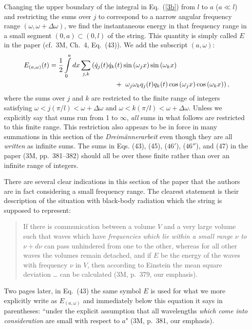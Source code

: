 \documentclass[12pt]{elsart}
\begin{document}
Changing the upper boundary  of the integral in Eq.\ (\ref{3b}) from $l$ to $a$ ($a \ll l$) and restricting the sums over $j$ to correspond to a narrow angular frequency range $(\omega, \omega + \Delta \omega)$, we find the instantaneous energy in that frequency range in a small segment $(0, a) \subset (0, l)$ of the string. This quantity is simply called $E$ in the paper (cf.\ 3M, Ch.\ 4, Eq.\ (43)). We add the subscript $(a, \omega)$:  
\begin{eqnarray}
\lefteqn{ E_{(a, \omega)}(t) = \frac{1}{2} \int_0^a dx \sum_{j,k}  \left(  \dot{q}_j(t) \dot{q}_k(t) 
\sin{(\omega_j x)} \sin{(\omega_k x)} \right.  } \nonumber \\
 & & \;\;\;\;\;\;\;\;\;  \;\;\;\;\;\;\;\;\; \;\;\;\;\;\;\;\;\; \;\;\;\;\;\;\;\;\;  \;\;\;\;\;\;\;\;\; \left.
 + \;\;  \omega_j \omega_k q_j(t) q_k(t) \cos{(\omega_j x)} \cos{(\omega_k x)} \right),
\label{5}
\end{eqnarray} 
where the sums over $j$ and $k$ are restricted to the finite range of integers satisfying $\omega < j (\pi/l) < \omega+\Delta\omega$ and $ \omega < k (\pi/l) < \omega+\Delta\omega$. Unless we explicitly say that sums run from 1 to $\infty$, {\it all} sums in what follows are restricted to this finite range. This restriction also appears to be in force in many summations in this section of the {\it Dreim\"annerarbeit} even though they are all {\it written} as infinite sums. The sums in Eqs. (43), (45), ($46'$), ($46''$), and (47) in the paper (3M, pp.\ 381--382) should all be over these finite rather than over an infinite range of integers.

There are several clear indications in this section of the paper that the authors are in fact considering a small frequency range. The clearest statement is their description of the situation with black-body radiation which the string is supposed to represent:
\begin{quotation}
If there is communication between a volume $V$ and a very large volume such that waves which have {\it frequencies which lie within a small range $\nu$ to $\nu + d\nu$} can pass unhindered from one to the other, whereas for all other waves the volumes remain detached, and if $E$ be the energy of the waves with frequency $\nu$ in $V$, then according to Einstein the mean square deviation \ldots
can be calculated (3M, p.\ 379, our emphasis).
\end{quotation}
Two pages later, in Eq.\ (43) the same symbol $E$ is used for what we more explicitly write as $E_{(a, \omega)}$ and immediately below this equation it says in parentheses:  ``under the explicit assumption that all wavelengths {\it which come into consideration} are small with respect to $a$" (3M, p.\ 381, our emphasis). 
\end{document}
